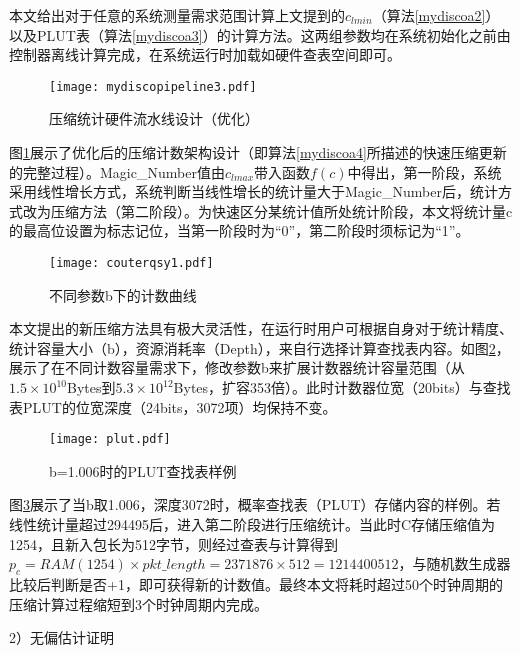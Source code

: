 本文给出对于任意的系统测量需求范围计算上文提到的$ c_{lmin} $（算法\ref{mydiscoa2}）以及PLUT表（算法\ref{mydiscoa3}）的计算方法。这两组参数均在系统初始化之前由控制器离线计算完成，在系统运行时加载如硬件查表空间即可。



\begin{figure}[!ht]
	\centering
	\texttt{[image: mydiscopipeline3.pdf]}
	\caption{压缩统计硬件流水线设计（优化）} \label{fig:mydiscopipeline}
\end{figure}

图\ref{fig:mydiscopipeline}展示了优化后的压缩计数架构设计（即算法\ref{mydiscoa4}所描述的快速压缩更新的完整过程）。Magic\_Number值由$c_{lmax}$带入函数$f(c)$中得出，第一阶段，系统采用线性增长方式，系统判断当线性增长的统计量大于Magic\_Number后，统计方式改为压缩方法（第二阶段）。为快速区分某统计值所处统计阶段，本文将统计量c的最高位设置为标志记位，当第一阶段时为“0”，第二阶段时须标记为“1”。

\begin{figure}[!ht]
	\centering
	\texttt{[image: couterqsy1.pdf]}
	\caption{不同参数b下的计数曲线} \label{fig:couterqsy1}
\end{figure}

本文提出的新压缩方法具有极大灵活性，在运行时用户可根据自身对于统计精度、统计容量大小（b），资源消耗率（Depth），来自行选择计算查找表内容。如图\ref{fig:couterqsy1}，展示了在不同计数容量需求下，修改参数b来扩展计数器统计容量范围（从$1.5\times 10^{10}$Bytes到$5.3\times 10^{12}$Bytes，扩容353倍）。此时计数器位宽（20bits）与查找表PLUT的位宽深度（24bits，3072项）均保持不变。

\begin{figure}[!ht]
	\centering
	\texttt{[image: plut.pdf]}
	\caption{b=1.006时的PLUT查找表样例} \label{fig:plut}
\end{figure}

图\ref{fig:plut}展示了当b取1.006，深度3072时，概率查找表（PLUT）存储内容的样例。若线性统计量超过294495后，进入第二阶段进行压缩统计。当此时C存储压缩值为1254，且新入包长为512字节，则经过查表与计算得到$ p_c=RAM(1254)\times pkt\_length= 2371876 \times 512 = 1214400512 $，与随机数生成器比较后判断是否+1，即可获得新的计数值。最终本文将耗时超过50个时钟周期的压缩计算过程缩短到3个时钟周期内完成。



2）无偏估计证明

